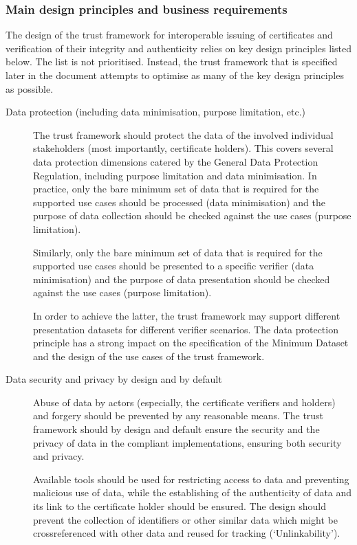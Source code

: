 \documentclass[a4paper,12pt,english]{sphinxhowto}
\begin{document}
\subsubsection{Main design principles and business requirements}
\label{\detokenize{ssi/privacycred:main-design-principles-and-business-requirements}}
\sphinxAtStartPar
The design of the trust framework for interoperable issuing of certificates and verification of their integrity and authenticity relies on key design principles listed below. The list is not prioritised. Instead, the trust framework that is specified later in the document attempts to optimise as many of the key design principles as possible.
\begin{description}
\item[{Data protection (including data minimisation, purpose limitation, etc.)}] \leavevmode
\sphinxAtStartPar
The trust framework should protect the data of the involved individual stakeholders (most importantly, certificate holders). This covers several data protection dimensions catered by the General Data Protection Regulation, including purpose limitation and data minimisation. In practice, only the bare minimum set of data that is required for the supported use cases should be processed (data minimisation) and the purpose of data collection should be checked against the use cases (purpose limitation).

\sphinxAtStartPar
Similarly, only the bare minimum set of data that is required for the supported use cases should be presented to a specific verifier (data minimisation) and the purpose of data presentation should be checked against the use cases (purpose limitation).

\sphinxAtStartPar
In order to achieve the latter, the trust framework may support different presentation datasets for different verifier scenarios. The data protection principle has a strong impact on the specification of the Minimum Dataset and the design of the use cases of the trust framework.

\item[{Data security and privacy by design and by default}] \leavevmode
\sphinxAtStartPar
Abuse of data by actors (especially, the certificate verifiers and holders) and forgery should be prevented by any reasonable means. The trust framework should by design and default ensure the security and the privacy of data in the compliant implementations, ensuring both security and privacy.

\sphinxAtStartPar
Available tools should be used for restricting access to data and preventing malicious use of data, while the establishing of the authenticity of data and its link to the certificate holder should be ensured. The design should prevent the collection of identifiers or other similar data which might be crossreferenced with other data and re\sphinxhyphen{}used for tracking (‘Unlinkability’).


\end{description}
\end{document}
